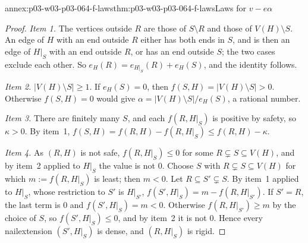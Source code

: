 \begin{annexitem}{annex:p03-w03-p03-064-f-laws}{thm:p03-w03-p03-064-f-laws}{Laws for \(v-e\alpha\)}
\begin{proof}
\emph{Item 1.}  The vertices outside \(R\) are those of \(S\setminus R\) and
those of \(V(H)\setminus S\).  An edge of \(H\) with an end outside \(R\)
either has both ends in \(S\), and is then an edge of \(H|_S\) with an end
outside \(R\), or has an end outside \(S\); the two cases exclude each other.
So \(e_H(R)=e_{H|_S}(R)+e_H(S)\), and the identity follows.

\emph{Item 2.}  \(|V(H)\setminus S|\geq1\).  If \(e_H(S)=0\), then
\(f(S,H)=|V(H)\setminus S|>0\).  Otherwise \(f(S,H)=0\) would give
\(\alpha=|V(H)\setminus S|/e_H(S)\), a rational number.

\emph{Item 3.}  There are finitely many \(S\), and each \(f(R,H|_S)\) is
positive by safety, so \(\kappa>0\).  By item~1,
\(f(S,H)=f(R,H)-f(R,H|_S)\leq f(R,H)-\kappa\).

\emph{Item 4.}  As \((R,H)\) is not safe, \(f(R,H|_S)\leq0\) for some
\(R\subsetneq S\subseteq V(H)\), and by item~2 applied to \(H|_S\) the value
is not \(0\).  Choose \(S\) with \(R\subsetneq S\subseteq V(H)\) for which
\(m:=f(R,H|_S)\) is least; then \(m<0\).  Let \(R\subseteq S'\subsetneq S\).
By item~1 applied to \(H|_S\), whose restriction to \(S'\) is \(H|_{S'}\),
\(f(S',H|_S)=m-f(R,H|_{S'})\).  If \(S'=R\), the last term is \(0\) and
\(f(S',H|_S)=m<0\).  Otherwise \(f(R,H|_{S'})\geq m\) by the choice of
\(S\), so \(f(S',H|_S)\leq0\), and by item~2 it is not \(0\).  Hence every
nailextension \((S',H|_S)\) is dense, and \((R,H|_S)\) is rigid.
\end{proof}
\end{annexitem}

